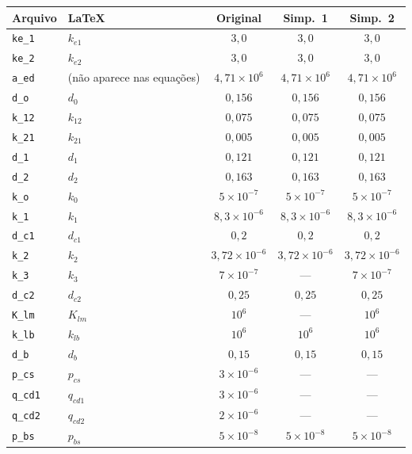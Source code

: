 \documentclass[11pt]{article}
\begin{document}
\begin{longtable}{llccc}
\toprule
Arquivo & \LaTeX & Original & Simp.~1 & Simp.~2 \\
\midrule
\endhead
\texttt{ke\_1}  & $k_{e1}$     & $3{,}0$ & $3{,}0$ & $3{,}0$ \\
\texttt{ke\_2}  & $k_{e2}$     & $3{,}0$ & $3{,}0$ & $3{,}0$ \\
\texttt{a\_ed}  & (não aparece nas equações) & $4{,}71\times10^{6}$ & $4{,}71\times10^{6}$ & $4{,}71\times10^{6}$ \\
\texttt{d\_o}   & $d_0$        & $0{,}156$ & $0{,}156$ & $0{,}156$ \\
\texttt{k\_12}  & $k_{12}$     & $0{,}075$ & $0{,}075$ & $0{,}075$ \\
\texttt{k\_21}  & $k_{21}$     & $0{,}005$ & $0{,}005$ & $0{,}005$ \\
\texttt{d\_1}   & $d_1$        & $0{,}121$ & $0{,}121$ & $0{,}121$ \\
\texttt{d\_2}   & $d_2$        & $0{,}163$ & $0{,}163$ & $0{,}163$ \\
\texttt{k\_o}   & $k_0$        & $5\times10^{-7}$ & $5\times10^{-7}$ & $5\times10^{-7}$ \\
\texttt{k\_1}   & $k_1$        & $8{,}3\times10^{-6}$ & $8{,}3\times10^{-6}$ & $8{,}3\times10^{-6}$ \\
\texttt{d\_c1}  & $d_{c1}$     & $0{,}2$ & $0{,}2$ & $0{,}2$ \\
\texttt{k\_2}   & $k_2$        & $3{,}72\times10^{-6}$ & $3{,}72\times10^{-6}$ & $3{,}72\times10^{-6}$ \\
\texttt{k\_3}   & $k_3$        & $7\times10^{-7}$ & --- & $7\times10^{-7}$ \\
\texttt{d\_c2}  & $d_{c2}$     & $0{,}25$ & $0{,}25$ & $0{,}25$ \\
\texttt{K\_lm}  & $K_{lm}$     & $10^{6}$ & --- & $10^{6}$ \\
\texttt{k\_lb}  & $k_{lb}$     & $10^{6}$ & $10^{6}$ & $10^{6}$ \\
\texttt{d\_b}   & $d_b$        & $0{,}15$ & $0{,}15$ & $0{,}15$ \\
\texttt{p\_cs}  & $p_{cs}$     & $3\times10^{-6}$ & --- & --- \\
\texttt{q\_cd1} & $q_{cd1}$    & $3\times10^{-6}$ & --- & --- \\
\texttt{q\_cd2} & $q_{cd2}$    & $2\times10^{-6}$ & --- & --- \\
\texttt{p\_bs}  & $p_{bs}$     & $5\times10^{-8}$ & $5\times10^{-8}$ & $5\times10^{-8}$ \\

\end{longtable}
\end{document}
